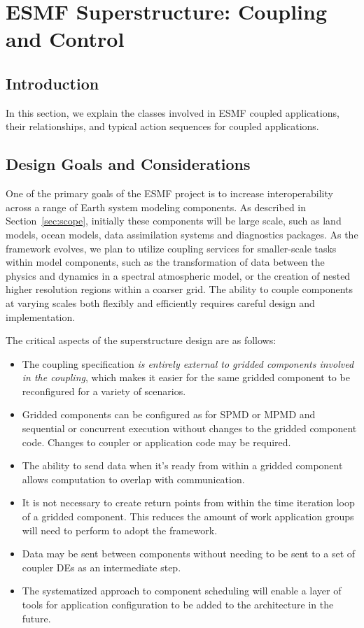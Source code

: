 \section{ESMF Superstructure:  Coupling and Control}
\label{sec:superclasses}

\subsection{Introduction}

In this section, we 
explain the classes involved in ESMF coupled applications, their 
relationships, and typical action sequences for coupled applications.  

\subsection{Design Goals and Considerations}

One of the primary goals of the ESMF project is to increase interoperability
across a range of Earth system modeling components.  As described in 
Section~\ref{sec:scope}, initially these 
components will be large scale, such as land models, ocean models, 
data assimilation systems and diagnostics packages.  As the 
framework evolves, we plan to utilize coupling services for smaller-scale 
tasks within model components, such as the transformation of data between the 
physics and dynamics in a spectral atmospheric model, or the creation 
of nested higher resolution regions within a coarser grid.  The ability to 
couple components at varying scales both flexibly and efficiently requires
careful design and implementation.  

The critical aspects of the superstructure design are as follows:
\begin{itemize}
\item The coupling specification {\it is entirely external to gridded 
components involved in the coupling}, which makes it easier for the 
same gridded component to be reconfigured for a variety of scenarios.
\item Gridded components can be configured as for SPMD or MPMD and 
sequential or concurrent execution without changes to the gridded 
component code.  Changes to coupler or application code may be required. 
\item The ability to send data when it's ready from within a gridded
component allows computation to overlap with communication.  
\item It is not necessary to create return points from 
within the time iteration loop of a gridded component.  This reduces the
amount of work application groups will need to perform to adopt the 
framework.
\item Data may be sent between components without needing to 
be sent to a set of coupler DEs as an intermediate step.
\item The systematized approach to component scheduling will
enable a layer of tools for application configuration to be added to
the architecture in the future.
\end{itemize}

